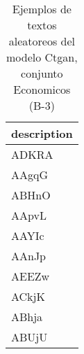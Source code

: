 \begin{table}[H]
\centering
\fontsize{8}{14}\selectfont
\caption{Ejemplos de textos aleatoreos del modelo Ctgan, conjunto Economicos (B-3)}
\label{table-sample10-economicos-b-3-ctgan-text}
\begin{tabular}{|m{50em}|}
\hline
\rowcolor[gray]{0.8}
description \\
\hline ADKRA \\
\hline AAgqG \\
\hline ABHnO \\
\hline AApvL \\
\hline AAYIc \\
\hline AAnJp \\
\hline AEEZw \\
\hline ACkjK \\
\hline ABhja \\
\hline ABUjU \\
\hline
\end{tabular}
\end{table}
